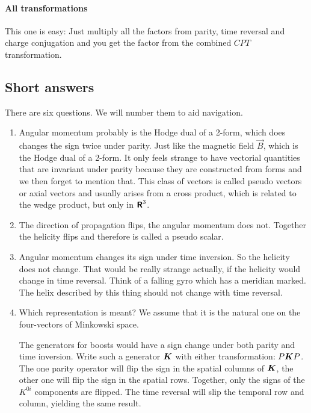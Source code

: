 \documentclass[11pt, english, fleqn, DIV=15, headinclude, BCOR=1cm]{scrartcl}
\begin{document}
\paragraph{All transformations}

This one is easy: Just multiply all the factors from parity, time reversal and
charge conjugation and you get the factor from the combined $CPT$
transformation.

\label{page:end_of_1_1}

\subsection{Short answers}

There are six questions. We will number them to aid navigation.

\begin{enumerate}
    \item
        Angular momentum probably is the Hodge dual of a 2-form, which does
        changes the sign twice under parity. Just like the magnetic field $\vec
        B$, which is the Hodge dual of a 2-form. It only feels strange to have
        vectorial quantities that are invariant under parity because they are
        constructed from forms and we then forget to mention that. This class
        of vectors is called pseudo vectors or axial vectors and usually arises
        from a cross product, which is related to the wedge product, but only
        in $\text{\bfseries\sffamily R}^3$.

    \item
        The direction of propagation flips, the angular momentum does not.
        Together the helicity flips and therefore is called a pseudo scalar.

    \item
        Angular momentum changes its sign under time inversion. So the helicity
        does not change. That would be really strange actually, if the helicity
        would change in time reversal. Think of a falling gyro which has a
        meridian marked. The helix described by this thing should not change
        with time reversal.

    \item
        Which representation is meant? We assume that it is the natural one on
        the four-vectors of Minkowski space.

        The generators for boosts would have a sign change under both parity
        and time inversion. Write such a generator $\mat K$ with either
        transformation: $P \mat K P$. The one parity operator will flip the
        sign in the spatial columns of $\mat K$, the other one will flip the
        sign in the spatial rows. Together, only the signs of the $K^{0i}$
        components are flipped. The time reversal will slip the temporal row
        and column, yielding the same result.


\end{enumerate}
\end{document}
